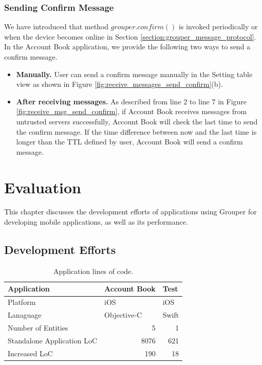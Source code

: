 \documentclass[a4paper,11pt]{report}
\begin{document}
\subsection{Sending Confirm Message}

We have introduced that method $grouper.confirm()$ is invoked periodically or when the device becomes online in Section \ref{section:grouper_message_protocol}.
In the Account Book application, we provide the following two ways to send a confirm message.

\begin{itemize}[leftmargin=7mm]
	\setlength{\itemsep}{1pt}
	\setlength{\parskip}{0pt}
	\setlength{\parsep}{0pt}
	\item \textbf{Manually.}
	User can send a confirm message manually in the Setting table view as shown in Figure \ref{fig:receive_messages_send_confirm}(b).
	\item \textbf{After receiving messages.}
	As described from line 2 to line 7 in Figure \ref{fig:receive_msg_send_confirm}, if Account Book receives messages from untrusted servers successfully, Account Book will check the last time to send the confirm message.
	If the time difference between now and the last time is longer than the TTL defined by user, Account Book will send a confirm message.

\end{itemize}

\chapter{Evaluation} \label{chapter:evaluation}

This chapter discusses the development efforts of applications using Grouper for developing mobile applications, as well as its performance.

\section{Development Efforts} \label{section:development_efforts}

\begin{table}
	\centering
	\begin{tabular}{lll}
		\toprule
		\textbf{Application} & \textbf{Account Book} & \textbf{Test} \\ 
		\midrule
		Platform & iOS & iOS \\ 
		Lanaguage & Objective-C & Swift \\ 
		Number of Entities & \multicolumn{1}{r}{5} & \multicolumn{1}{r}{1} \\ 
		Standalone Application LoC & \multicolumn{1}{r}{8076} & \multicolumn{1}{r}{621} \\ 
		Increased LoC &  \multicolumn{1}{r}{190} &  \multicolumn{1}{r}{18} \\ 
		\bottomrule
	\end{tabular}
	\caption{Application lines of code.}
	\label{table:loc}
\end{table}
\end{document}
